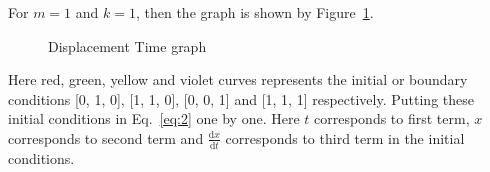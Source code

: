 For $m=1$ and $k=1$, then the graph is shown by Figure~\ref{fig:Displacement Time graph1}.
\begin{figure}
        \begin{center}
\end{center}
\caption{Displacement Time graph}
\label{fig:Displacement Time graph1}
\end{figure}
Here red, green, yellow and violet curves represents the initial or boundary 
conditions [0, 1, 0], [1, 1, 0], [0, 0, 1] and [1, 1, 1] respectively. Putting 
these initial conditions in Eq.~\ref{eq:2} one by one. Here $t$ corresponds to first 
term, $x$ corresponds to second term and $\frac{\mathrm{d}x}{\mathrm{d}t}$ 
corresponds to third term in the initial conditions.
